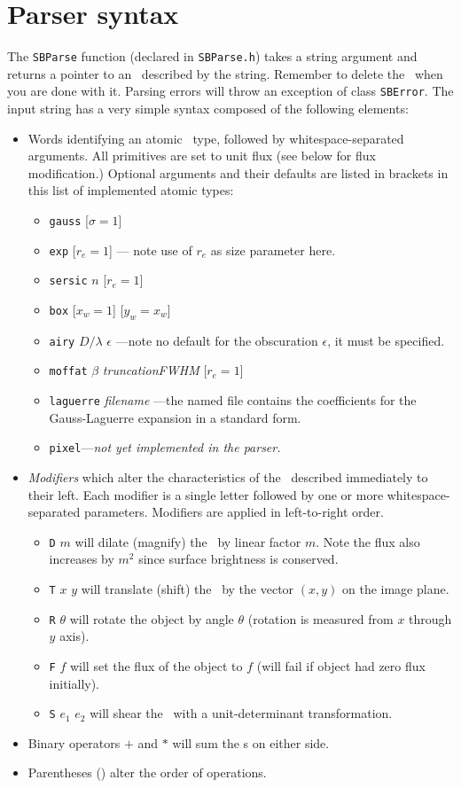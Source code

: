 \documentclass[11pt,preprint,flushrt]{aastex}
\begin{document}
\section{Parser syntax}
The {\tt SBParse} function (declared in {\tt SBParse.h}) takes a string argument and returns a pointer to an \sbp\ described by the string.  Remember to delete the \sbp\ when you are done with it.  Parsing errors will throw an exception of class {\tt SBError}.  The input string has a very simple syntax composed of the following elements:
\begin{itemize}
\item Words identifying an atomic \sbp\ type, followed by whitespace-separated arguments.  All primitives are set to unit flux (see below for flux modification.) Optional arguments and their defaults are listed in brackets in this list of implemented atomic types:
\begin{itemize}
\item {\tt gauss} [$\sigma=1$]
\item {\tt exp} [$r_e=1$] --- note use of $r_e$ as size parameter here.
\item {\tt sersic} $n$ [$r_e=1$]
\item {\tt box} [$x_w=1$] [$y_w=x_w$]
\item {\tt airy} $D/\lambda$ $\epsilon$ ---note no default for the obscuration $\epsilon$, it must be specified.
\item {\tt moffat} $\beta$ {\em truncationFWHM} [$r_e=1$]
\item {\tt laguerre} {\em filename} ---the named file contains the coefficients for the Gauss-Laguerre expansion in a standard form.
\item {\tt pixel}---{\em not yet implemented in the parser.}
\end{itemize}
\item {\em Modifiers} which alter the characteristics of the \sbp\ described immediately to their left.  Each modifier is a single letter followed by one or more whitespace-separated parameters.  Modifiers are applied in left-to-right order.
\begin{itemize}
\item {\tt D} $m$  will dilate (magnify) the \sbp\ by linear factor $m$.  Note the flux also increases by $m^2$ since surface brightness is conserved.
\item {\tt T} $x$ $y$ will translate (shift) the \sbp\ by the vector $(x,y)$ on the image plane.
\item {\tt R} $\theta$ will rotate the object by angle $\theta$ (rotation is measured from $x$ through $y$ axis).
\item {\tt F} $f$  will set the flux of the object to $f$ (will fail if object had zero flux initially).
\item {\tt S} $e_1$ $e_2$  will shear the \sbp\ with a unit-determinant transformation.
\end{itemize}
\item Binary operators $+$ and $*$ will sum the {\sbp}s on either side.
\item Parentheses () alter the order of operations.  
\end{itemize}
\end{document}
